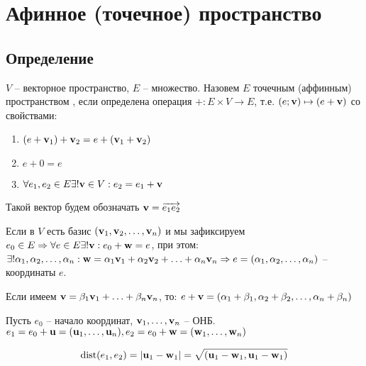 \chapter{Афинное (точечное) пространство}
\section{Определение}

\begin{definition}
    $V$ -- векторное пространство, $E$ -- множество. Назовем $E$ точечным (аффинным)
    пространством , если определена операция $+: E\times V \to E$, т.е. $(e; \mathbf{v}) \mapsto (e+\mathbf{v})$
    со свойствами:
    \begin{enumerate}
        \item $(e+\mathbf{v}_1) + \mathbf{v}_2 = e + (\mathbf{v}_1 + \mathbf{v}_2)$
        \item $e + 0 = e$
        \item $\forall e_1, e_2 \in E \exists! \mathbf{v} \in V: e_2 = e_1 + \mathbf{v}$
    \end{enumerate}
    Такой вектор будем обозначать $\mathbf{v} = \overrightarrow{e_1 e_2}$


\end{definition}


\begin{definition}
    
    Если в $V$ есть базис $(\mathbf{v}_1, \mathbf{v}_2, \ldots, \mathbf{v}_n)$ и мы зафиксируем
    $e_0 \in E \Rightarrow \forall e \in E \exists! \mathbf{v}:e_0 + \mathbf{w} = e$, при этом:
        $\exists! \alpha_1, \alpha_2, \ldots, \alpha_n: \mathbf{w} = \alpha_ 1 \mathbf{v}_1 + \alpha_2 \mathbf{v}_2 + \ldots + \alpha_n \mathbf{v}_n \Rightarrow e = (\alpha_1, \alpha_2, \ldots, \alpha_n)$ -- координаты $e$.
    
        Если имеем $\mathbf{v} = \beta_1 \mathbf{v}_1 + \ldots + \beta_n \mathbf{v}_n$, то: $e + \mathbf{v} = (\alpha_1 + \beta_1, \alpha_2 + \beta_2, \ldots, \alpha_n + \beta_n)$ 
\end{definition}


\begin{definition}[Расстояние]
    Пусть $e_0$ -- начало координат, $\mathbf{v}_1, \ldots, \mathbf{v}_n$ -- ОНБ. $e_1 = e_0 + \mathbf{u} = (\mathbf{u}_1, \ldots, \mathbf{u}_n), e_2 = e_0 + \mathbf{w} = (\mathbf{w}_1, \ldots, \mathbf{w}_n)$

    \[\operatorname{dist} (e_1, e_2) = |\mathbf{u}_1 - \mathbf{w}_1| = \sqrt{(\mathbf{u}_1 - \mathbf{w}_1, \mathbf{u}_1 - \mathbf{w}_1)}\]
\end{definition}


